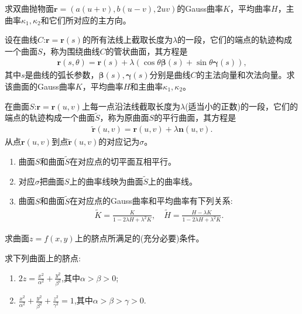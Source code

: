 \documentclass[../../main.tex]{subfiles}%
\begin{document}
\begin{example}
求双曲抛物面$\bm{r}=(a(u+v),b(u-v),2uv)$的Gauss曲率$K$，平均曲率$H$，主曲率$\kappa_1,\kappa_2$和它们所对应的主方向。
\end{example}

\begin{example}
设在曲线$C$:$\bm{r}=\bm{r}(s)$的所有法线上截取长度为$\lambda$的一段，它们的端点的轨迹构成一个曲面$S$，称为围绕曲线$C$的管状曲面，其方程是
\begin{align*}
\bm{r}(s,\theta)=\bm{r}(s)+\lambda(\cos\theta\bm{\beta}(s)+\sin\theta\bm{\gamma}(s)),
\end{align*}
其中$s$是曲线的弧长参数，$\bm{\beta}(s),\bm{\gamma}(s)$分别是曲线$C$的主法向量和次法向量。求该曲面的Gauss曲率$K$，平均曲率$H$和主曲率$\kappa_1,\kappa_2$。
\end{example}

\begin{example}
在曲面$S$:$\bm{r}=\bm{r}(u,v)$上每一点沿法线截取长度为$\lambda$(适当小的正数)的一段，它们的端点的轨迹构成一个曲面$\tilde{S}$，称为原曲面$S$的平行曲面，其方程是
\begin{align*}
\tilde{\bm{r}}(u,v)=\bm{r}(u,v)+\lambda\bm{n}(u,v).
\end{align*}
从点$\bm{r}(u,v)$到点$\tilde{\bm{r}}(u,v)$的对应记为$\sigma$。
\begin{enumerate}[(1)]
\item 曲面$S$和曲面$\tilde{S}$在对应点的切平面互相平行。

\item 对应$\sigma$把曲面$S$上的曲率线映为曲面$\tilde{S}$上的曲率线。

\item 曲面$S$和曲面$\tilde{S}$在对应点的Gauss曲率和平均曲率有下列关系:
\begin{align*}
\tilde{K}=\frac{K}{1-2\lambda H+\lambda^{2}K},\quad \tilde{H}=\frac{H-\lambda K}{1-2\lambda H+\lambda^{2}K}.
\end{align*}
\end{enumerate}
\end{example}

\begin{example}
求曲面$z=f(x,y)$上的脐点所满足的(充分必要)条件。
\end{example}

\begin{example}
求下列曲面上的脐点:
\begin{enumerate}[(1)]
\item $2z=\frac{x^{2}}{\alpha^{2}}+\frac{y^{2}}{\beta^{2}}$,其中$\alpha>\beta>0$;
\item $\frac{x^{2}}{\alpha^{2}}+\frac{y^{2}}{\beta^{2}}+\frac{z^{2}}{\gamma^{2}}=1$,其中$\alpha>\beta>\gamma>0$.
\end{enumerate}
\end{example}
\end{document}
